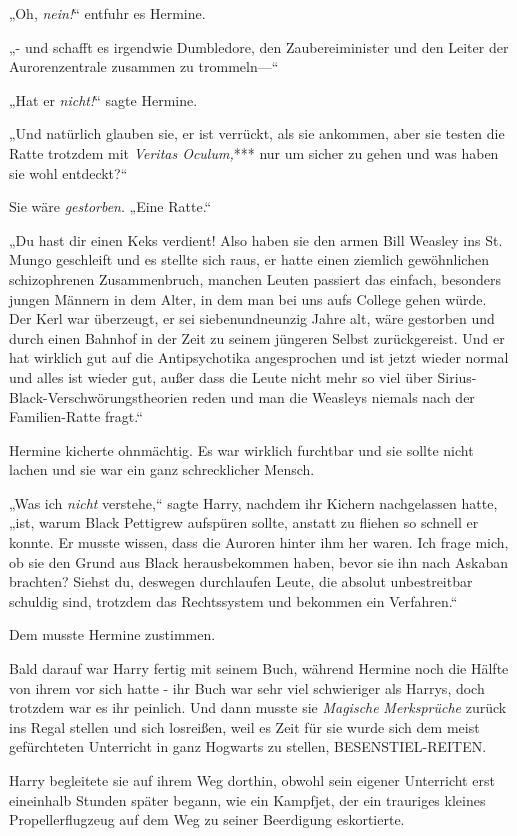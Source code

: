 {„Oh, \emph{nein!}“ entfuhr es Hermine.

„- und schafft es irgendwie Dumbledore, den Zaubereiminister und den Leiter der Aurorenzentrale zusammen zu trommeln—“

„Hat er \emph{nicht!}“ sagte Hermine.

„Und natürlich glauben sie, er ist verrückt, als sie ankommen, aber sie testen die Ratte trotzdem mit \emph{Veritas Oculum,}*** nur um sicher zu gehen und was haben sie wohl entdeckt?“

Sie wäre \emph{gestorben}. „Eine Ratte.“

„Du hast dir einen Keks verdient! Also haben sie den armen Bill Weasley ins St. Mungo geschleift und es stellte sich raus, er hatte einen ziemlich gewöhnlichen schizophrenen Zusammenbruch, manchen Leuten passiert das einfach, besonders jungen Männern in dem Alter, in dem man bei uns aufs College gehen würde. Der Kerl war überzeugt, er sei siebenundneunzig Jahre alt, wäre gestorben und durch einen Bahnhof in der Zeit zu seinem jüngeren Selbst zurückgereist. Und er hat wirklich gut auf die Antipsychotika angesprochen und ist jetzt wieder normal und alles ist wieder gut, außer dass die Leute nicht mehr so viel über Sirius-Black-Verschwörungstheorien reden und man die Weasleys niemals nach der Familien-Ratte fragt.“

Hermine kicherte ohnmächtig. Es war wirklich furchtbar und sie sollte nicht lachen und sie war ein ganz schrecklicher Mensch.

„Was ich \emph{nicht} verstehe,“ sagte Harry, nachdem ihr Kichern nachgelassen hatte, „ist, warum Black Pettigrew aufspüren sollte, anstatt zu fliehen so schnell er konnte. Er musste wissen, dass die Auroren hinter ihm her waren. Ich frage mich, ob sie den Grund aus Black herausbekommen haben, bevor sie ihn nach Askaban brachten? Siehst du, deswegen durchlaufen Leute, die absolut unbestreitbar schuldig sind, trotzdem das Rechtssystem und bekommen ein Verfahren.“

Dem musste Hermine zustimmen.

Bald darauf war Harry fertig mit seinem Buch, während Hermine noch die Hälfte von ihrem vor sich hatte - ihr Buch war sehr viel schwieriger als Harrys, doch trotzdem war es ihr peinlich. Und dann musste sie \emph{Magische} \emph{Merksprüche} zurück ins Regal stellen und sich losreißen, weil es Zeit für sie wurde sich dem meist gefürchteten Unterricht in ganz Hogwarts zu stellen, BESENSTIEL-REITEN.

Harry begleitete sie auf ihrem Weg dorthin, obwohl sein eigener Unterricht erst eineinhalb Stunden später begann, wie ein Kampfjet, der ein trauriges kleines Propellerflugzeug auf dem Weg zu seiner Beerdigung eskortierte.

}
